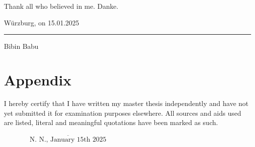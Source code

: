 \documentclass[12pt,twoside,a4paper,parskip]{scrbook} %
\def\BaAuthor{Bibin Babu}
\def\SubmitDate{January 15th 2025}
\def\ShowBaAuthor{\BaAuthor}
\def\ShowBaAuthor{N.~N.}
\begin{document}
Thank all who believed in me. Danke.
\vspace{2em}

\hfill Würzburg, on 15.01.2025

\vspace{2em}

\noindent\rule{6cm}{0.4pt}

\vspace{0.5em}

\noindent Bibin Babu
\tableofcontents

\listoffigures
{}

\listoftables
{}

\mainmatter
















\backmatter
\appendix
\chapter{Appendix}\label{appendix}

\cleardoublepage
{}
{}
\printbibliography


I hereby certify that I have written my master thesis independently and have not yet submitted it for examination purposes elsewhere. All sources and aids used are listed, literal and meaningful quotations have been marked as such.

\vspace{20pt}
\begin{flushright}
$\overline{~~~~~~~~~~~~~~~~~\mbox{\ShowBaAuthor, \SubmitDate}~~~~~~~~~~~~~~~~~}$
\end{flushright}
\end{document}
